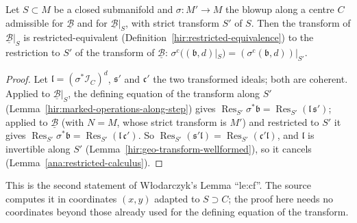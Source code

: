\begin{lemma}
\label{mc:restrict-step}
\leanok
Let \(S\subset M\) be a closed submanifold and \(\sigma\colon M'\to M\) the blowup along a centre \(C\) admissible for \(\underline{\mathcal B}\) and for
\(\underline{\mathcal B}|_S\), with strict transform \(S'\) of \(S\). Then the transform of \(\underline{\mathcal B}|_S\) is restricted-equivalent
(Definition~\ref{hir:restricted-equivalence}) to the restriction to \(S'\) of the transform of \(\underline{\mathcal B}\):
\(\sigma^{\mathrm c}((\mathfrak b,d)|_S)=(\sigma^{\mathrm c}(\mathfrak b,d))|_{S'}\).
\end{lemma}
\begin{proof}
\leanok
Let \(\mathfrak l=(\sigma^*\mathcal I_C)^d\), \(\mathfrak s'\) and \(\mathfrak c'\) the two transformed ideals; both are coherent. Applied to
\(\underline{\mathcal B}|_S\), the defining equation of the transform along \(S'\) (Lemma~\ref{hir:marked-operations-along-step}) gives
\(\operatorname{Res}_{S'}\sigma^*\mathfrak b=\operatorname{Res}_{S'}(\mathfrak l\,\mathfrak s')\); applied to \(\underline{\mathcal B}\) (with \(N=M\), whose strict
transform is \(M'\)) and restricted to \(S'\) it gives \(\operatorname{Res}_{S'}\sigma^*\mathfrak b=\operatorname{Res}_{S'}(\mathfrak l\,\mathfrak c')\). So
\(\operatorname{Res}_{S'}(\mathfrak s'\mathfrak l)=\operatorname{Res}_{S'}(\mathfrak c'\mathfrak l)\), and \(\mathfrak l\) is invertible along \(S'\)
(Lemma~\ref{hir:geo-transform-wellformed}), so it cancels (Lemma~\ref{ana:restricted-calculus}).
\end{proof}
This is the second statement of Włodarczyk's Lemma ``le:cf''. The source computes it in coordinates \((x,y)\) adapted to \(S\supset C\); the proof here
needs no coordinates beyond those already used for the defining equation of the transform.

